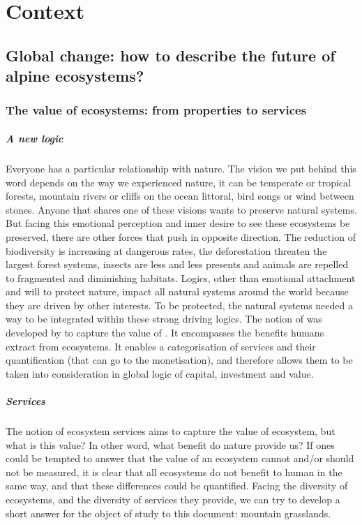 

\chapter{Context}

\section{Global change: how to describe the future of alpine ecosystems?}

\subsection{The value of ecosystems: from properties to services}

\paragraph{A new logic}
Everyone has a particular relationship with nature. The vision we put behind this word depends on the way we experienced nature, it can be temperate or tropical forests, mountain rivers or cliffs on the ocean littoral, bird songs or wind between stones. Anyone that shares one of these visions wants to preserve natural systems. But facing this emotional perception and inner desire to see these ecosystems be preserved, there are other forces that push in opposite direction. The reduction of biodiversity is increasing at dangerous rates, the deforestation threaten the largest forest systems, insects are less and less presents and animals are repelled to fragmented and diminishing habitats. Logics, other than emotional attachment and will to protect nature, impact all natural systems around the world because they are driven by other interests. To be protected, the natural systems needed a way to be integrated within these strong driving logics. The notion of  was developed by \cite{costanza_value_1997} to capture the value of . It encompasses the benefits humans extract from ecosystems. It enables a categorisation of services and their quantification (that can go to the monetisation), and therefore allows them to be taken into consideration in global logic of capital, investment and value.


\paragraph{Services}
The notion of ecosystem services aims to capture the value of ecosystem, but what is this value? In other word, what benefit do nature provide us? If ones could be tempted to answer that the value of an ecosystem cannot and/or should not be measured, it is clear that all ecosystems do not benefit to human in the same way, and that these differences could be quantified. Facing the diversity of ecosystems, and the diversity of services they provide, we can try to develop a short answer for the object of study to this document: mountain grasslands.

